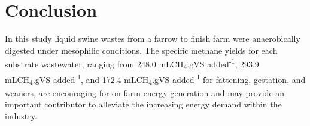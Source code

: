 \section{Conclusion}
In this study liquid swine wastes from a farrow to finish farm were anaerobically digested under mesophilic conditions. The specific methane yields for each substrate wastewater, ranging from 248.0 mLCH\textsubscript{4}.gVS added\textsuperscript{-1}, 293.9 mLCH\textsubscript{4}.gVS added\textsuperscript{-1}, and 172.4 mLCH\textsubscript{4}.gVS added\textsuperscript{-1} for fattening, gestation, and weaners, are encouraging for on farm energy generation and may provide an important contributor to alleviate the increasing energy demand within the industry. 